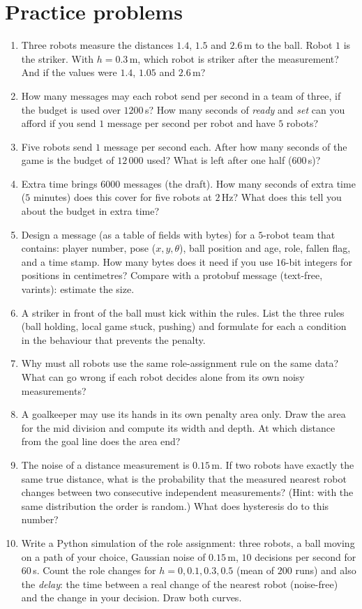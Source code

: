 \section*{Practice problems}
\begin{enumerate}[label=\textbf{\thechapter.\arabic*}]
  \item Three robots measure the distances $1.4$, $1.5$ and $2.6$\,m to the ball. Robot $1$ is the striker. With $h=0.3$\,m, which robot is striker after the measurement? And if the values were $1.4$, $1.05$ and $2.6$\,m?
  \item How many messages may each robot send per second in a team of three, if the budget is used over $1200$\,s? How many seconds of \emph{ready} and \emph{set} can you afford if you send $1$ message per second per robot and have $5$ robots?
  \item Five robots send $1$ message per second each. After how many seconds of the game is the budget of $12\,000$ used? What is left after one half ($600$\,s)?
  \item Extra time brings $6000$ messages (the draft). How many seconds of extra time ($5$ minutes) does this cover for five robots at $2$\,Hz? What does this tell you about the budget in extra time?
  \item Design a message (as a table of fields with bytes) for a $5$-robot team that contains: player number, pose ($x,y,\theta$), ball position and age, role, fallen flag, and a time stamp. How many bytes does it need if you use $16$-bit integers for positions in centimetres? Compare with a protobuf message (text-free, varints): estimate the size.
  \item A striker in front of the ball must kick within the rules. List the three rules (ball holding, local game stuck, pushing) and formulate for each a condition in the behaviour that prevents the penalty.
  \item Why must all robots use the same role-assignment rule on the same data? What can go wrong if each robot decides alone from its own noisy measurements?
  \item A goalkeeper may use its hands in its own penalty area only. Draw the area for the mid division and compute its width and depth. At which distance from the goal line does the area end?
  \item The noise of a distance measurement is $0.15$\,m. If two robots have exactly the same true distance, what is the probability that the measured nearest robot changes between two consecutive independent measurements? (Hint: with the same distribution the order is random.) What does hysteresis do to this number?
  \item[\textbf{\thechapter.10}$\star$] Write a Python simulation of the role assignment: three robots, a ball moving on a path of your choice, Gaussian noise of $0.15$\,m, $10$ decisions per second for $60$\,s. Count the role changes for $h=0,0.1,0.3,0.5$ (mean of $200$ runs) and also the \emph{delay}: the time between a real change of the nearest robot (noise-free) and the change in your decision. Draw both curves.
\end{enumerate}
